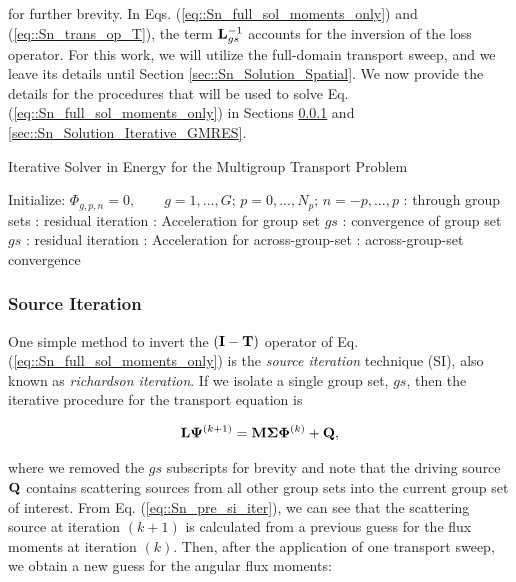 \noindent for further brevity. In Eqs. (\ref{eq::Sn_full_sol_moments_only}) and (\ref{eq::Sn_trans_op_T}), the term ${\bf L}_{gs}^{-1}$ accounts for the inversion of the loss operator. For this work, we will utilize the full-domain transport sweep, and we leave its details until Section \ref{sec::Sn_Solution_Spatial}. We now provide the details for the procedures that will be used to solve Eq. (\ref{eq::Sn_full_sol_moments_only}) in Sections \ref{sec::Sn_Solution_Iterative_SI} and \ref{sec::Sn_Solution_Iterative_GMRES}.

\begin{algorithm}
\caption{Iterative Solver in Energy for the Multigroup Transport Problem}
\label{alg::Sn_Linear_Transport_Solve}
\begin{algorithmic}[1]
\State Initialize: $\Phi_{g,p,n} = 0, \qquad g=1,...,G; \, p=0,...,N_p; \, n=-p,...,p$
	: through group sets
			: residual iteration
			: Acceleration for group set $gs$
			: convergence of group set $gs$
		\EndFor
	\EndFor
	: residual iteration
	:  Acceleration for across-group-set
	: across-group-set convergence
\EndFor
\end{algorithmic}
\end{algorithm}

\subsubsection{Source Iteration}
\label{sec::Sn_Solution_Iterative_SI}

One simple method to invert the $({\bf I} - {\bf T})$ operator of Eq. (\ref{eq::Sn_full_sol_moments_only}) is the {\em source iteration} technique (SI), also known as {\em richardson iteration}. If we isolate a single group set, $gs$, then the iterative procedure for the transport equation is

\begin{equation}
\label{eq::Sn_pre_si_iter}
{\bf L} {\bf \Psi}^{(k+1)} =    {\bf M} {\bf \Sigma} {\bf \Phi}^{(k)} +  {\bf Q} ,
\end{equation}

\noindent where we removed the $gs$ subscripts for brevity and note that the driving source ${\bf Q}$ contains scattering sources from all other group sets into the current group set of interest. From Eq. (\ref{eq::Sn_pre_si_iter}), we can see that the scattering source at iteration $(k+1)$ is calculated from a previous guess for the flux moments at iteration $(k)$. Then, after the application of one transport sweep, we obtain a new guess for the angular flux moments:

